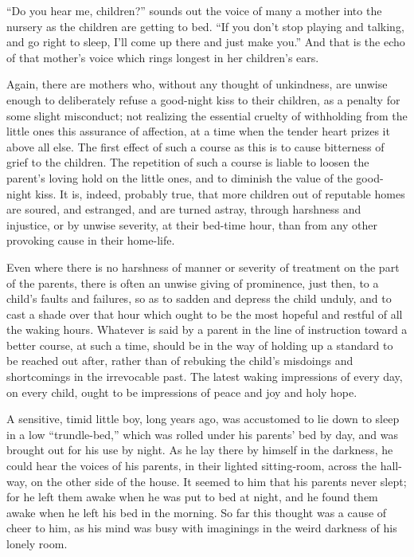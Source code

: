 \documentclass[
]{book}
\begin{document}
``Do you hear me, children?'' sounds out the voice of many a mother into the nursery as the children are getting to bed. ``If you don't stop playing and talking, and go right to sleep, I'll come up there and just make you.'' And that is the echo of that mother's voice which rings longest in her children's ears.

Again, there are mothers who, without any thought of unkindness, are unwise enough to deliberately refuse a good-night kiss to their children, as a penalty for some slight misconduct; not realizing the essential cruelty of withholding from the little ones this assurance of affection, at a time when the tender heart prizes it above all else. The first effect of such a course as this is to cause bitterness of grief to the children. The repetition of such a course is liable to loosen the parent's loving hold on the little ones, and to diminish the value of the good-night kiss. It is, indeed, probably true, that more children out of reputable homes are soured, and estranged, and are turned astray, through harshness and injustice, or by unwise severity, at their bed-time hour, than from any other provoking cause in their home-life.

Even where there is no harshness of manner or severity of treatment on the part of the parents, there is often an unwise giving of prominence, just then, to a child's faults and failures, so as to sadden and depress the child unduly, and to cast a shade over that hour which ought to be the most hopeful and restful of all the waking hours. Whatever is said by a parent in the line of instruction toward a better course, at such a time, should be in the way of holding up a standard to be reached out after, rather than of rebuking the child's misdoings and shortcomings in the irrevocable past. The latest waking impressions of every day, on every child, ought to be impressions of peace and joy and holy hope.

A sensitive, timid little boy, long years ago, was accustomed to lie down to sleep in a low ``trundle-bed,'' which was rolled under his parents' bed by day, and was brought out for his use by night. As he lay there by himself in the darkness, he could hear the voices of his parents, in their lighted sitting-room, across the hall-way, on the other side of the house. It seemed to him that his parents never slept; for he left them awake when he was put to bed at night, and he found them awake when he left his bed in the morning. So far this thought was a cause of cheer to him, as his mind was busy with imaginings in the weird darkness of his lonely room.
\end{document}
